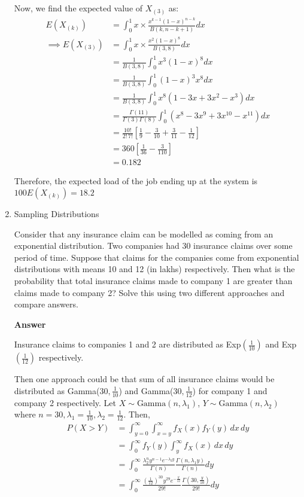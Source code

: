 \documentclass[12pt, oneside]{article}
\begin{document}
\begin{enumerate}
{  Now, we find the expected value of \(X_{(3)}\) as:
  \begin{align*}
    E(X_{(k)}) &= \int_{0}^{1} x \times \frac{x^{k-1} (1-x)^{n-k}}{B(k, n - k + 1)} dx \\
    \implies E(X_{(3)}) &= \int_{0}^{1} x \times \frac{x^{2} (1-x)^{8}}{B(3, 8)} dx \tag*{(\(\because n = 10\))} \\
      &= \frac{1}{B(3, 8)} \int_{0}^{1} x^3 (1 - x)^8 dx \\
      &= \frac{1}{B(3, 8)} \int_{0}^{1} (1 - x)^3 x^8 dx \\
      &= \frac{1}{B(3, 8)} \int_{0}^{1} x^8 (1 - 3x + 3x^2 - x^3) dx \\
      &= \frac{\Gamma(11)}{\Gamma(3)\Gamma(8)} \int_{0}^{1} (x^8 - 3x^9 + 3x^{10} - x^{11}) dx \\
      &= \frac{10!}{2!\,7!} \left[\frac{1}{9} - \frac{3}{10} + \frac{3}{11} - \frac{1}{12}\right] \\
      &= 360 \left[ \frac{1}{36} - \frac{3}{110} \right] \\
      &= 0.182
  \end{align*}

  Therefore, the expected load of the job ending up at the  system is \(100E(X_{(k)}) = 18.2\)
}



\item	{
  Sampling Distributions 

  Consider that any insurance claim can be modelled as coming from an exponential distribution.
  Two companies had 30 insurance claims over some period of time. Suppose that claims for the
  companies come from exponential distributions with means 10 and 12 (in lakhs) respectively.
  Then what is the probability that total insurance claims made to company 1 are greater than
  claims made to company 2? Solve this using two different approaches and compare answers.

  \textbf{Answer}

  Insurance claims to companies 1 and 2 are distributed as Exp\((\frac{1}{10})\) and 
  Exp\((\frac{1}{12})\) respectively.

  Then one approach could be that sum of all insurance claims would be distributed as
  Gamma(\(30, \frac{1}{10}\)) and Gamma(\(30, \frac{1}{12}\)) for company 1 and company 2
  respectively. Let \(X \sim \text{Gamma}(n, \lambda_1)\), \(Y \sim \text{Gamma}(n, \lambda_2)\)
  where \(n = 30, \lambda_1 = \frac{1}{10}, \lambda_2 = \frac{1}{12}\). Then,
  \begin{align*}
    P(X > Y) &= \int_{y=0}^{\infty} \int_{x=y}^{\infty} f_X(x) f_Y(y) \,dx \,dy \\
      &= \int_{0}^{\infty} f_Y(y) \int_{y}^{\infty} f_X(x) \,dx \,dy \\
      &= \int_{0}^\infty \frac{\lambda_2^n y^{n-1} e^{-\lambda_2 y}}{\Gamma(n)} \frac{\Gamma(n, \lambda_1 y)}{\Gamma(n)} dy \tag*{(where \(\Gamma(\cdot, \cdot)\) is the upper incomplete Gamma function)} \\
      &= \int_{0}^\infty \frac{\left(\frac{1}{12}\right)^{30} y^{29} e^{-\frac{y}{12}}}{29!} \frac{\Gamma(30, \frac{y}{10})}{29!} dy
  \end{align*}

}
\end{enumerate}
\end{document}
